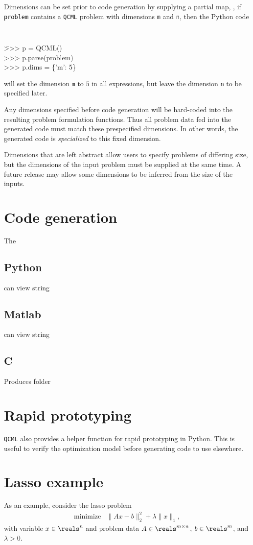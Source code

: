 \documentclass[11pt]{article}
\def\qcml{\texttt{QCML}\xspace}
\begin{document}
Dimensions can be set prior to code generation by supplying
a partial map, \ie, if {\tt problem} contains a \qcml problem with 
dimensions \texttt{m} and \texttt{n}, then the Python code
{\tt
\begin{tabbing}
  \qquad \= >>> p = QCML() \\
  \> >>> p.parse(problem) \\
  \> >>> p.dims = \{'m': 5\}
\end{tabbing}
}
\noindent will set the dimension {\tt m} to $5$ in all expressions, but leave 
the dimension {\tt n} to be specified later.

Any dimensions specified before code generation will be hard-coded into the
resulting problem formulation functions. Thus all problem data fed into the
generated code must match these prespecified dimensions. In other words, the
generated code is \emph{specialized} to this fixed dimension.

Dimensions that are left abstract allow users to specify problems of
differing size, but the dimensions of the input problem must be supplied at
the same time. A future release may allow some dimensions to be inferred from
the size of the inputs.

\section{Code generation}
The 
\subsection{Python}
can view string
\subsection{Matlab}
can view string
\subsection{C}
Produces folder

\section{Rapid prototyping}
\qcml also provides a helper function for rapid prototyping in Python. This
is useful to verify the optimization model before generating code to use
elsewhere.

\section{Lasso example}
As an example, consider the lasso problem
\[
\begin{array}{ll}
  \mbox{minimize} & \|Ax - b\|_2^2 + \lambda \|x\|_1,
\end{array}
\]
with variable $x \in \reals^n$ and problem data $A\in\reals^{m\times n}$, 
$b \in \reals^m$, and $\lambda > 0$.
\end{document}
